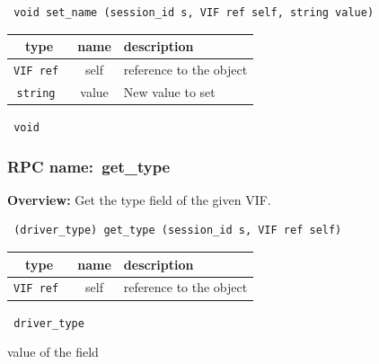\begin{verbatim} void set_name (session_id s, VIF ref self, string value)\end{verbatim}



 
\vspace{0.3cm}
\begin{tabular}{|c|c|p{7cm}|}
 \hline
{\bf type} & {\bf name} & {\bf description} \\ \hline
{\tt VIF ref } & self & reference to the object \\ \hline 

{\tt string } & value & New value to set \\ \hline 

\end{tabular}

\vspace{0.3cm}

{\tt 
void
}



\vspace{0.3cm}
\vspace{0.3cm}
\vspace{0.3cm}
\subsubsection{RPC name:~get\_type}

{\bf Overview:} 
Get the type field of the given VIF.

\begin{verbatim} (driver_type) get_type (session_id s, VIF ref self)\end{verbatim}



 
\vspace{0.3cm}
\begin{tabular}{|c|c|p{7cm}|}
 \hline
{\bf type} & {\bf name} & {\bf description} \\ \hline
{\tt VIF ref } & self & reference to the object \\ \hline 

\end{tabular}

\vspace{0.3cm}

{\tt 
driver\_type
}


value of the field
\vspace{0.3cm}
\vspace{0.3cm}
\vspace{0.3cm}
